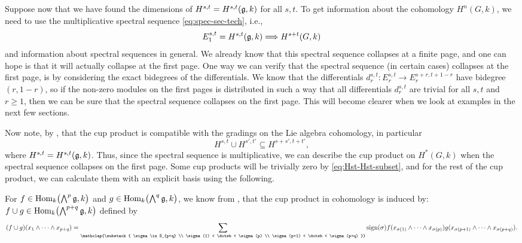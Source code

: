 Suppose now that we have found the dimensions of $H^{s,t} = H^{s,t}(\mathfrak{g},k)$ for all $s,t$. To get information about the cohomology $H^{n}(G,k)$, we need to use the multiplicative spectral sequence \eqref{eq:spec-sec-tech}, i.e.,
\begin{equation*}
  E_{1}^{s,t} = H^{s,t}(\mathfrak{g}, k) \Longrightarrow H^{s+t}(G,k)
\end{equation*}
and information about spectral sequences in general. We already know that this spectral sequence collapses at a finite page, and one can hope is that it will actually collapse at the first page. One way we can verify that the spectral sequence (in certain cases) collapses at the first page, is by considering the exact bidegrees of the differentials. We know that the differentials $d_{r}^{s,t} \colon E_{r}^{s,t} \to E_{r}^{s+r,t+1-r}$ have bidegree $(r,1-r)$, so if the non-zero modules on the first pages is distributed in such a way that all differentials $d_{r}^{s,t}$ are trivial for all $s,t$ and $r\geq1$, then we can be sure that the spectral sequence collapses on the first page. This will become clearer when we look at examples in the next few sections.

Now note, by \cite[§3.7]{Fuks}, that the cup product is compatible with the gradings on the Lie algebra cohomology, in particular
\begin{equation}
H^{s,t} \cup H^{s',t'} \subseteq H^{s+s',t+t'},\label{eq:Hst-Hst-subset}
\end{equation}
where $H^{s,t} = H^{s,t}(\mathfrak{g},k)$. Thus, since the spectral sequence is multiplicative, we can describe the cup product on $H^{*}(G,k)$ when the spectral sequence collapses on the first page. Some cup products will be trivially zero by \eqref{eq:Hst-Hst-subset}, and for the rest of the cup product, we can calculate them with an explicit basis using the following.

For $f \in \operatorname{Hom}_{k}\bigl( \bigwedge^{p}\mathfrak{g}, k \bigr)$ and $g \in \operatorname{Hom}_{k}\bigl( \bigwedge^{q}\mathfrak{g}, k \bigr)$, we know from \cite[Chap.~XIII, Sect.~8]{CartanHomAlg}, that the cup product in cohomology is induced by: $f \cup g \in \operatorname{Hom}_{k}\bigl( \bigwedge^{p+q}\mathfrak{g}, k \bigr)$ defined by
\begin{equation}
  \label{eq:cup-prod-def}
  (f \cup g)(x_{1} \wedge \dotsb \wedge x_{p+q})  = \sum_{\mathclap{\substack{ \sigma \in S_{p+q} \\ \sigma(1) < \dotsb < \sigma(p) \\ \sigma(p+1) < \dotsb < \sigma(p+q) }}} \sign(\sigma) f(x_{\sigma(1)} \wedge \dotsb \wedge x_{\sigma(p)}) g(x_{\sigma(p+1)} \wedge \dotsb \wedge x_{\sigma(p+q)}).
\end{equation}

